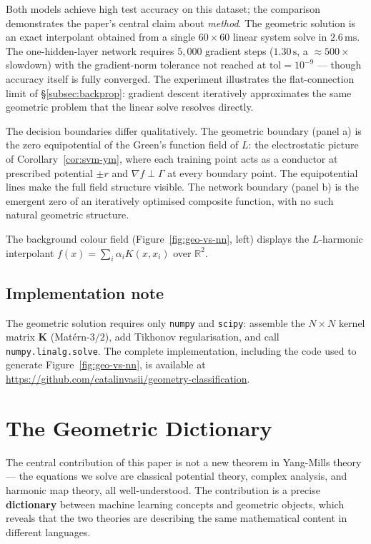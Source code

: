 \documentclass[11pt, a4paper]{article}
\theoremstyle{plain}
\theoremstyle{definition}
\newcommand{\R}{\mathbb{R}}
\begin{document}
Both models achieve high test accuracy on this dataset; the comparison
demonstrates the paper's central claim about \emph{method}. The geometric
solution is an exact interpolant obtained from a single $60\!\times\!60$
linear system solve in $2.6\,\mathrm{ms}$. The one-hidden-layer network
requires $5{,}000$ gradient steps ($1.30\,\mathrm{s}$, a ${\approx}500\times$
slowdown) with the gradient-norm tolerance not reached at $\mathrm{tol}=10^{-9}$
--- though accuracy itself is fully converged. The experiment illustrates the
flat-connection limit of \S\ref{subsec:backprop}: gradient descent iteratively
approximates the same geometric problem that the linear solve resolves directly.

The decision boundaries differ qualitatively. The geometric boundary (panel
a) is the zero equipotential of the Green's function field of $L$: the
electrostatic picture of Corollary~\ref{cor:svm-ym}, where each training
point acts as a conductor at prescribed potential $\pm r$ and $\nabla f
\perp \Gamma$ at every boundary point. The equipotential lines make the
full field structure visible. The network boundary (panel b) is the emergent
zero of an iteratively optimised composite function, with no such natural
geometric structure.

The background colour field (Figure~\ref{fig:geo-vs-nn}, left) displays the
$L$-harmonic interpolant $f(x) = \sum_i \alpha_i K(x, x_i)$ over $\R^2$.

\subsection{Implementation note}

The geometric solution requires only \texttt{numpy} and \texttt{scipy}: assemble
the $N\times N$ kernel matrix $\mathbf{K}$ (Mat\'ern-$3/2$), add Tikhonov
regularisation, and call \texttt{numpy.linalg.solve}. The complete implementation,
including the code used to generate Figure~\ref{fig:geo-vs-nn}, is available at
\url{https://github.com/catalinvasii/geometry-classification}.

\section{The Geometric Dictionary}\label{sec:dictionary}

The central contribution of this paper is not a new theorem in Yang-Mills theory
--- the equations we solve are classical potential theory, complex analysis, and
harmonic map theory, all well-understood. The contribution is a precise
\textbf{dictionary} between machine learning concepts and geometric objects,
which reveals that the two theories are describing the same mathematical content
in different languages.
\end{document}

